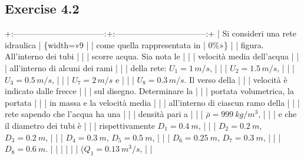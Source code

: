 \documentclass[letterpaper,10pt,italian]{jupyterBook}
\begin{document}
\subsection{Exercise 4.2}
\label{\detokenize{polimi/fluidmechanics-ita/template/capitoli/04_bilanci/0406in:exercise-4-2}}\label{\detokenize{polimi/fluidmechanics-ita/template/capitoli/04_bilanci/0406in:fluid-mechanics-balances-ex-02}}\label{\detokenize{polimi/fluidmechanics-ita/template/capitoli/04_bilanci/0406in::doc}}
\sphinxAtStartPar
+:———————————:+:———————————:+
| Si consideri una rete idraulica   | \{width=»9 |
| come quella rappresentata in      | 0\%»\}                              |
| figura. All’interno dei tubi      |                                   |
| scorre acqua. Sia nota le         |                                   |
| velocità media dell’acqua         |                                   |
| all’interno di alcuni dei rami    |                                   |
| della rete: \(U_1 = 1\, m/s\),      |                                   |
| \(U_2 = 1.5\, m/s\),                |                                   |
| \(U_3 = 0.5\, m/s\),                |                                   |
| \(U_7 = 2\, m/s\) e                 |                                   |
| \(U_8 = 0.3\, m/s\). Il verso della |                                   |
| velocità è indicato dalle frecce  |                                   |
| sul disegno. Determinare la       |                                   |
| portata volumetrica, la portata   |                                   |
| in massa e la velocità media      |                                   |
| all’interno di ciascun ramo della |                                   |
| rete sapendo che l’acqua ha una   |                                   |
| densità pari a                    |                                   |
| \(\overline{\rho} = 999\ kg/m^3\),  |                                   |
| e che il diametro dei tubi è      |                                   |
| rispettivamente \(D_1=0.4\ m\),     |                                   |
| \(D_2=0.2\ m\), \(D_3=0.2\ m\),       |                                   |
| \(D_4=0.3\ m\), \(D_5=0.5\ m\),       |                                   |
| \(D_6=0.25\ m\), \(D_7=0.3\ m\),      |                                   |
| \(D_8=0.6\ m\).                     |                                   |
|                                   |                                   |
| (\(Q_1 = 0.13\ m^3/s\),             |                                   |
\end{document}

